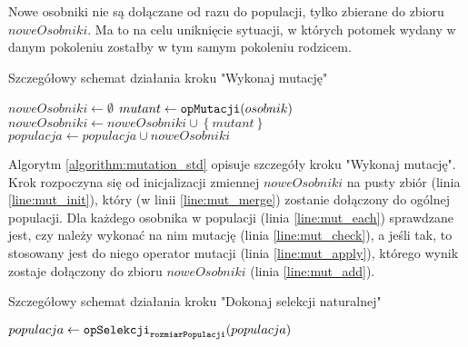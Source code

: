 \documentclass[./FM_mgr.tex]{subfiles}
\begin{document}
Nowe osobniki nie są dołączane od razu do populacji, tylko zbierane do zbioru $noweOsobniki$.
Ma to na celu uniknięcie sytuacji, w których potomek wydany w danym pokoleniu zostałby w tym samym pokoleniu rodzicem.

\begin{algorithm}[h]
	\caption{Szczegółowy schemat działania kroku "Wykonaj mutację"	\label{algorithm:mutation_std}}
	\begin{algorithmic}[1]
		\Start
		\Var $noweOsobniki \gets \emptyset$
		\label{line:mut_init}
		\label{line:mut_each}
		\label{line:mut_check}
		\Var $mutant \gets \mathtt{opMutacji}(osobnik)$
		\label{line:mut_apply}
		\State $noweOsobniki \gets noweOsobniki \cup \left\{ mutant \right\}$
		\label{line:mut_add}
		\EndIf 
		\EndFor
		\State $populacja \gets populacja \cup noweOsobniki$
		\label{line:mut_merge}
		\EndProcedure
	\end{algorithmic}
\end{algorithm}

Algorytm \ref{algorithm:mutation_std} opisuje szczegóły kroku "Wykonaj mutację". Krok rozpoczyna się od inicjalizacji zmiennej $noweOsobniki$ na pusty zbiór (linia \ref{line:mut_init}), który (w linii \ref{line:mut_merge}) zostanie dołączony do ogólnej populacji. Dla każdego osobnika w populacji (linia \ref{line:mut_each}) sprawdzane jest, czy należy wykonać na nim mutację (linia \ref{line:mut_check}), a jeśli tak, to stosowany jest do niego operator mutacji (linia \ref{line:mut_apply}), którego wynik zostaje dołączony do zbioru $noweOsobniki$ (linia \ref{line:mut_add}).

\begin{algorithm}[h]
	\caption{Szczegółowy schemat działania kroku "Dokonaj selekcji naturalnej"	\label{algorithm:natSel_std}}
	\begin{algorithmic}[1]
		\Start
		\State $populacja \gets \mathtt{opSelekcji}_{\mathtt{rozmiarPopulacji}}(populacja)$
		\label{line:sel_apply}
		\EndProcedure
	\end{algorithmic}
\end{algorithm}
\end{document}
